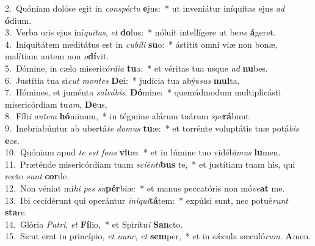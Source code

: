{2.~}Quóniam dolóse egit in \textit{con}\textit{spé}\textit{ctu} \textbf{e}jus:~* ut inveniátur iníquitas ejus \textit{ad} \textbf{ó}dium.\\
{3.~}Verba oris ejus iní\textit{qui}\textit{tas}, \textit{et} \textbf{do}lus:~* nóluit intellígere ut be\textit{ne} \textbf{á}geret.\\
{4.~}Iniquitátem meditátus est in \textit{cu}\textit{bí}\textit{li} \textbf{su}o:~* ástitit omni viæ non bonæ, malítiam autem non \textit{o}\textbf{dí}vit.\\
{5.~}Dómine, in cælo miseri\textit{cór}\textit{di}\textit{a} \textbf{tu}a:~* et véritas tua usque \textit{ad} \textbf{nu}bes.\\
{6.~}Justítia tua si\textit{cut} \textit{mon}\textit{tes} \textbf{De}i:~* judícia tua abýs\textit{sus} \textbf{mul}ta.\\
{7.~}Hómines, et juménta \textit{sal}\textit{vá}\textit{bis}, \textbf{Dó}mine:~* quemádmodum multiplicásti misericórdiam tu\textit{am}, \textbf{De}us,\\
{8.~}Fíli\textit{i} \textit{au}\textit{tem} \textbf{hó}minum,~* in tégmine alárum tuárum \textit{spe}\textbf{rá}bunt.\\
{9.~}Inebriabúntur ab ubertá\textit{te} \textit{do}\textit{mus} \textbf{tu}æ:~* et torrénte voluptátis tuæ potá\textit{bis} \textbf{e}os.\\
{10.~}Quóniam apud \textit{te} \textit{est} \textit{fons} \textbf{vi}tæ:~* et in lúmine tuo vidébi\textit{mus} \textbf{lu}men.\\
{11.~}Præténde misericórdiam tuam \textit{sci}\textit{én}\textit{ti}\textbf{bus} te,~* et justítiam tuam his, qui recto \textit{sunt} \textbf{cor}de.\\
{12.~}Non véniat mi\textit{hi} \textit{pes} \textit{su}\textbf{pér}biæ:~* et manus peccatóris non mó\textit{ve}\textbf{at} me.\\
{13.~}Ibi cecidérunt qui operántur \textit{i}\textit{ni}\textit{qui}\textbf{tá}tem:~* expúlsi sunt, nec potué\textit{runt} \textbf{sta}re.\\
{14.~}Glória \textit{Pa}\textit{tri}, \textit{et} \textbf{Fí}lio,~* et Spirítu\textit{i} \textbf{San}cto.\\
{15.~}Sicut erat in princípio, \textit{et} \textit{nunc}, \textit{et} \textbf{sem}per,~* et in sǽcula sæculó\textit{rum}. \textbf{A}men.\\
